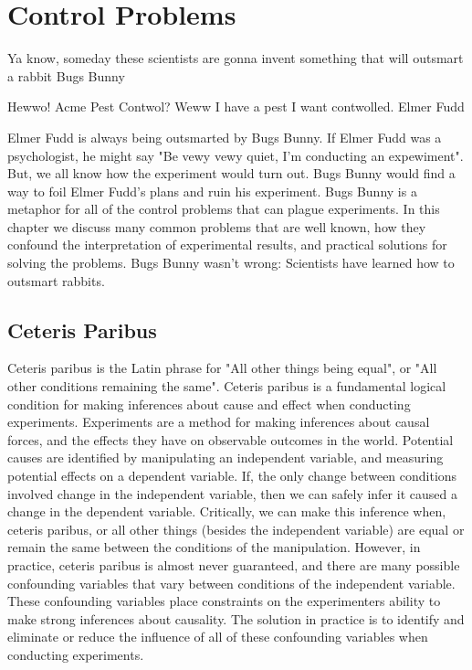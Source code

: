 \chapter{Control Problems}

Ya know, someday these scientists are gonna invent something that will outsmart a rabbit
Bugs Bunny

Hewwo! Acme Pest Contwol? Weww I have a pest I want contwolled.
Elmer Fudd

Elmer Fudd is always being outsmarted by Bugs Bunny. If Elmer Fudd was a psychologist, he might say "Be vewy vewy quiet, I'm conducting an expewiment". But, we all know how the experiment would turn out. Bugs Bunny would find a way to foil Elmer Fudd's plans and ruin his experiment. Bugs Bunny is a metaphor for all of the control problems that can plague experiments. In this chapter we discuss many common problems that are well known, how they confound the interpretation of experimental results, and practical solutions for solving the problems. Bugs Bunny wasn't wrong: Scientists have learned how to outsmart rabbits.

\section{Ceteris Paribus}

Ceteris paribus is the Latin phrase for "All other things being equal", or "All other conditions remaining the same". Ceteris paribus is a fundamental logical condition for making inferences about cause and effect when conducting experiments. Experiments are a method for making inferences about causal forces, and the effects they have on observable outcomes in the world. Potential causes are identified by manipulating an independent variable, and measuring potential effects on a dependent variable. If, the only change between conditions involved change in the independent variable, then we can safely infer it caused a change in the dependent variable. Critically, we can make this inference when, ceteris paribus, or all other things (besides the independent variable) are equal or remain the same between the conditions of the manipulation. However, in practice, ceteris paribus is almost never guaranteed, and there are many possible confounding variables that vary between conditions of the independent variable. These confounding variables place constraints on the experimenters ability to make strong inferences about causality. The solution in practice is to identify and eliminate or reduce the influence of all of these confounding variables when conducting experiments.

